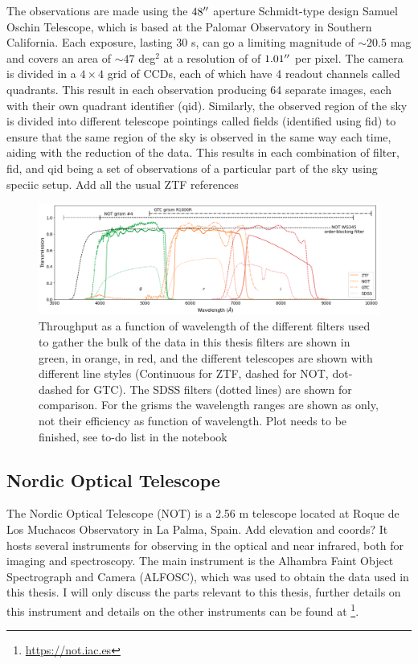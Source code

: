 \documentclass[a4paper,oneside,12pt, class=Latex/Classes/PhDthesisPSnPDF, crop=false]{standalone}
\begin{document}
The observations are made using the $48^{\prime\prime}$ aperture Schmidt-type design Samuel Oschin Telescope, which is based at the Palomar Observatory in Southern California. Each exposure, lasting 30 s, can go a limiting magnitude of $\sim20.5$ mag and covers an area of $\sim47$ deg$^2$ at a resolution of of $1.01^{\prime\prime}$ per pixel. The camera is divided in a $4\times4$ grid of CCDs, each of which have 4 readout channels called quadrants. This result in each observation producing 64 separate images, each with their own quadrant identifier (qid). Similarly, the observed region of the sky is divided into different telescope pointings called fields (identified using fid) to ensure that the same region of the sky is observed in the same way each time, aiding with the reduction of the data. This results in each combination of filter, fid, and qid being a set of observations of a particular part of the sky using speciic setup. \color{red} Add all the usual ZTF references \color{black}

\begin{figure}
    \centering
    \includegraphics[width=\textwidth]{../Images/chapter_2/transmissions.png}
    \caption{Throughput as a function of wavelength of the different filters used to gather the bulk of the data in this thesis \ztfg filters are shown in green, \ztfr in orange, \ztfi in red, and the different telescopes are shown with different line styles (Continuous for ZTF, dashed for NOT, dot-dashed for GTC). The SDSS filters (dotted lines) are shown for comparison. For the grisms the wavelength ranges are shown as only, not their efficiency as function of wavelength. \color{red}Plot needs to be finished, see to-do list in the notebook \color{black}}
    \label{Optical_elements_plot}
\end{figure}


\subsection{Nordic Optical Telescope}
The Nordic Optical Telescope (NOT) is a 2.56 m telescope located at Roque de Los Muchacos Observatory in La Palma, Spain. \color{red} Add elevation and coords? \color{black} It hosts several instruments for observing in the optical and near infrared, both for imaging and spectroscopy. The main instrument is the Alhambra Faint Object Spectrograph and Camera (ALFOSC), which was used to obtain the data used in this thesis. I will only discuss the parts relevant to this thesis, further details on this instrument and  details on the other instruments can be found at \footnote{\url{https://not.iac.es}}.
\end{document}
